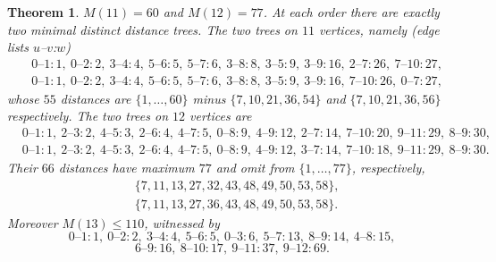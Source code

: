\documentclass[11pt,a4paper]{article}
\theoremstyle{plain}
\newtheorem{theorem}{Theorem}[section]
\theoremstyle{remark}
\begin{document}
\begin{theorem}\label{thm:mdd}
$M(11)=60$ and $M(12)=77$.  At each order there are exactly two minimal
distinct distance trees.  The two trees on $11$
vertices, namely (edge lists $u$--$v$:$w$)
\begin{align*}
&0\text{--}1{:}1,\ 0\text{--}2{:}2,\ 3\text{--}4{:}4,\ 5\text{--}6{:}5,\ 5\text{--}7{:}6,\
3\text{--}8{:}8,\ 3\text{--}5{:}9,\ 3\text{--}9{:}16,\ 2\text{--}7{:}26,\ 7\text{--}10{:}27,\\
&0\text{--}1{:}1,\ 0\text{--}2{:}2,\ 3\text{--}4{:}4,\ 5\text{--}6{:}5,\ 5\text{--}7{:}6,\
3\text{--}8{:}8,\ 3\text{--}5{:}9,\ 3\text{--}9{:}16,\ 7\text{--}10{:}26,\ 0\text{--}7{:}27,
\end{align*}
whose $55$ distances are $\{1,\dots,60\}$ minus $\{7,10,21,36,54\}$ and
$\{7,10,21,36,56\}$ respectively.  The two trees on $12$ vertices are
\begin{align*}
&0\text{--}1{:}1,\ 2\text{--}3{:}2,\ 4\text{--}5{:}3,\ 2\text{--}6{:}4,\
4\text{--}7{:}5,\ 0\text{--}8{:}9,\ 4\text{--}9{:}12,\ 2\text{--}7{:}14,\
7\text{--}10{:}20,\ 9\text{--}11{:}29,\ 8\text{--}9{:}30,\\
&0\text{--}1{:}1,\ 2\text{--}3{:}2,\ 4\text{--}5{:}3,\ 2\text{--}6{:}4,\
4\text{--}7{:}5,\ 0\text{--}8{:}9,\ 4\text{--}9{:}12,\ 3\text{--}7{:}14,\
7\text{--}10{:}18,\ 9\text{--}11{:}29,\ 8\text{--}9{:}30.
\end{align*}
Their $66$ distances have maximum $77$ and omit from $\{1,\dots,77\}$,
respectively,
\begin{align*}
&\{7,11,13,27,32,43,48,49,50,53,58\},\\
&\{7,11,13,27,36,43,48,49,50,53,58\}.
\end{align*}
Moreover $M(13)\le 110$, witnessed by
\[
  0\text{--}1{:}1,\ 0\text{--}2{:}2,\ 3\text{--}4{:}4,\ 5\text{--}6{:}5,\
  0\text{--}3{:}6,\ 5\text{--}7{:}13,\ 8\text{--}9{:}14,\ 4\text{--}8{:}15,
\]
\[
  6\text{--}9{:}16,\ 8\text{--}10{:}17,\ 9\text{--}11{:}37,\ 9\text{--}12{:}69 .
\]
\end{theorem}
\end{document}
